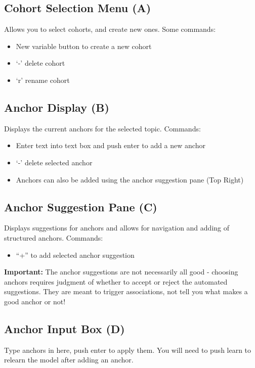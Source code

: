 \documentclass[12pt]{article}
\begin{document}
\subsection{Cohort Selection Menu (A)}
Allows you to select cohorts, and create new ones.
Some commands:
\begin{itemize}
\item New variable button to create a new cohort
\item `-' delete cohort
\item `r' rename cohort
\end{itemize}


\subsection{Anchor Display (B)}
Displays the current anchors for the selected topic.
Commands:
\begin{itemize}
\item Enter text into text box and push enter to add a new anchor
\item `-' delete selected anchor
\item Anchors can also be added using the anchor suggestion pane (Top Right)
\end{itemize}

\subsection{Anchor Suggestion Pane (C)}
Displays suggestions for anchors and allows for navigation and adding of structured anchors.
Commands:
\begin{itemize}
\item ``+'' to add selected anchor suggestion
\end{itemize}
{\bf Important:} The anchor suggestions are not necessarily all good - choosing anchors requires judgment of whether to accept or reject the automated suggestions. They are  meant to trigger associations, not  tell you what makes a good anchor or not!

\subsection{Anchor Input Box (D)}
Type anchors in here, push enter to apply them. You will need to push learn to relearn the model after adding an anchor.
\end{document}
